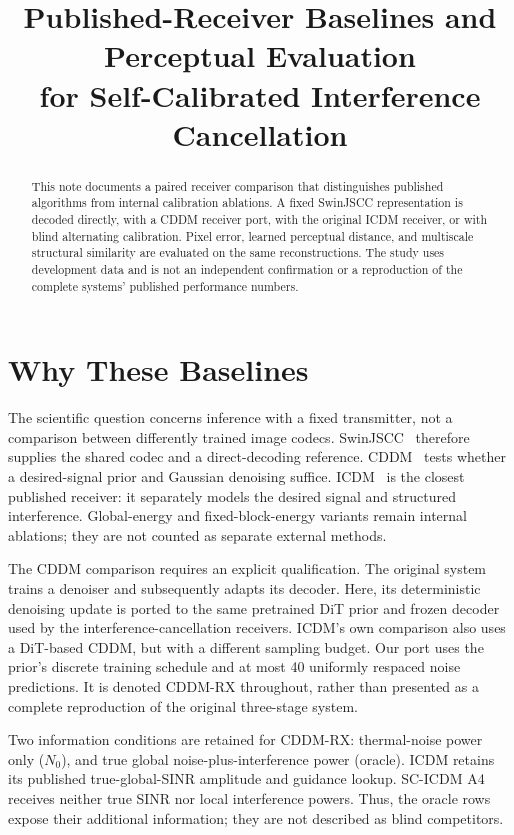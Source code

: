\documentclass[conference]{IEEEtran}
\begin{document}
\title{Published-Receiver Baselines and Perceptual Evaluation\\for Self-Calibrated Interference Cancellation}
\author{
}
\maketitle
\begin{abstract}
This note documents a paired receiver comparison that distinguishes published
algorithms from internal calibration ablations. A fixed SwinJSCC representation
is decoded directly, with a CDDM receiver port, with the original ICDM receiver,
or with blind alternating calibration. Pixel error, learned perceptual distance,
and multiscale structural similarity are evaluated on the same reconstructions.
The study uses development data and is not an independent confirmation or a
reproduction of the complete systems' published performance numbers.
\end{abstract}

\section{Why These Baselines}
The scientific question concerns inference with a fixed transmitter, not a
comparison between differently trained image codecs. SwinJSCC~\cite{yang2025swinjscc}
therefore supplies the shared codec and a direct-decoding reference.
CDDM~\cite{wu2024cddm} tests whether a desired-signal prior and Gaussian
denoising suffice. ICDM~\cite{wu2026icdm} is the closest published receiver:
it separately models the desired signal and structured interference.
Global-energy and fixed-block-energy variants remain internal ablations;
they are not counted as separate external methods.

The CDDM comparison requires an explicit qualification. The original system
trains a denoiser and subsequently adapts its decoder. Here, its deterministic
denoising update is ported to the same pretrained DiT prior and frozen decoder
used by the interference-cancellation receivers. ICDM's own comparison also
uses a DiT-based CDDM, but with a different sampling budget. Our port uses the
prior's discrete training schedule and at most 40 uniformly respaced noise
predictions. It is denoted CDDM-RX throughout, rather than presented as a
complete reproduction of the original three-stage system.

Two information conditions are retained for CDDM-RX: thermal-noise power only
($N_0$), and true global noise-plus-interference power (oracle). ICDM retains its
published true-global-SINR amplitude and guidance lookup. SC-ICDM A4 receives
neither true SINR nor local interference powers. Thus, the oracle rows expose
their additional information; they are not described as blind competitors.
\end{document}
